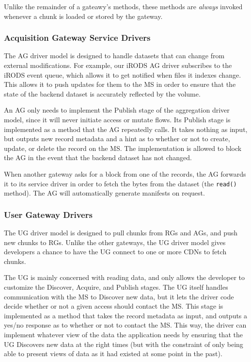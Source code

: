 Unlike the remainder of a gateawy's methods, these methods are \emph{always}
invoked whenever a chunk is loaded or stored by the gateway.

\subsubsection{Acquisition Gateway Service Drivers}

The AG driver model is designed to handle datasets that can change from
external modifications.  For example, our iRODS AG driver
subscribes to the iRODS event queue, which allows it to get notified
when files it indexes change.  This allows it to push updates for them to the MS
in order to ensure that the state of the backend dataset is accurately reflected
by the volume.

 An AG only needs to implement the Publish stage of
the aggregation driver model, since it will never initiate access or mutate
flows.  Its Publish stage is implemented as a method that the AG repeatedly
calls.  It takes nothing as input, but outputs new record metadata and a
hint as to whether or not to create, update, or delete the record on the MS.  The
implementation is allowed to block the AG in the event that the backend dataset
has not changed.

 When another gateway asks for a block from
one of the records, the AG forwards it to its service driver in order to fetch
the bytes from the dataset (the \texttt{read()} method).  The AG will
automatically generate manifests on request.

\subsubsection{User Gateway Drivers}

The UG driver model is designed to pull chunks from RGs and AGs, and push new
chunks to RGs.  Unlike the other gateways, the UG driver model gives developers
a chance to have the UG connect to one or more CDNs to fetch chunks.

  The UG is mainly concerned with reading
data, and only allows the developer to customize the Discover, Acquire, and
Publish stages.  The UG itself handles communication with the MS to Discover new data,
but it lets the driver code decide whether or not a given access should contact
the MS.  This stage is implemented as a method that takes the record metadata as
input, and outputs a yes/no response as to whether or not to contact the MS.
This way, the driver can implement
whatever view of the data the application needs by ensuring that the UG
Discovers new data at the right times (but with the constraint of only being
able to present views of data as it had existed at some point in the past).

